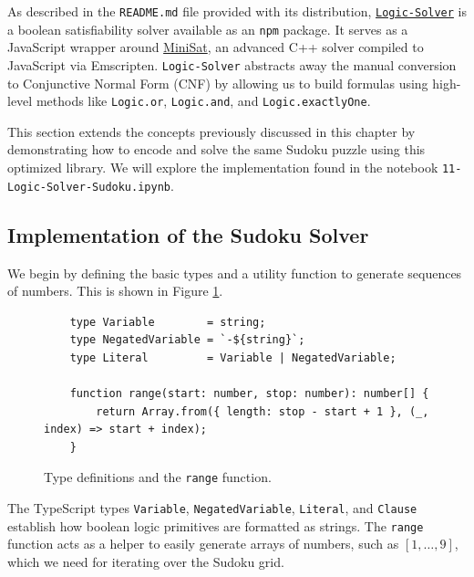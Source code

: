 As described in the \texttt{README.md} file provided with its distribution,
\href{https://github.com/meteor/logic-solver}{\texttt{Logic-Solver}} is a boolean satisfiability solver
available as an \texttt{npm} package. It serves as a JavaScript wrapper around
\href{http://minisat.se/}{MiniSat}, an advanced C++ solver compiled to JavaScript via
Emscripten. \texttt{Logic-Solver} abstracts away the manual conversion to Conjunctive Normal Form (CNF) by
allowing us to build formulas using high-level methods like \texttt{Logic.or}, \texttt{Logic.and}, and
\texttt{Logic.exactlyOne}. 

This section extends the concepts previously discussed in this chapter by demonstrating how
to encode and solve the same Sudoku puzzle using this optimized library. We will explore the implementation
found in the notebook \texttt{11-Logic-Solver-Sudoku.ipynb}. 

\subsection{Implementation of the Sudoku Solver}
We begin by defining the basic types and a utility function to generate sequences of numbers. This is shown in
Figure \ref{fig:logicsolver-range}. 

\begin{figure}[!ht]
  \centering
\begin{verbatim}
    type Variable        = string;
    type NegatedVariable = `-${string}`; 
    type Literal         = Variable | NegatedVariable;
    
    function range(start: number, stop: number): number[] {
        return Array.from({ length: stop - start + 1 }, (_, index) => start + index);
    }
\end{verbatim}
\vspace*{-0.3cm}
  \caption{Type definitions and the \texttt{range} function.}
  \label{fig:logicsolver-range}
\end{figure} %

The TypeScript types \texttt{Variable}, \texttt{NegatedVariable}, \texttt{Literal}, and \texttt{Clause}
establish how boolean logic primitives are formatted as strings. The \texttt{range} function acts as a helper
to easily generate arrays of numbers, such as $[1, \dots, 9]$, which we need for iterating over the Sudoku
grid. 

